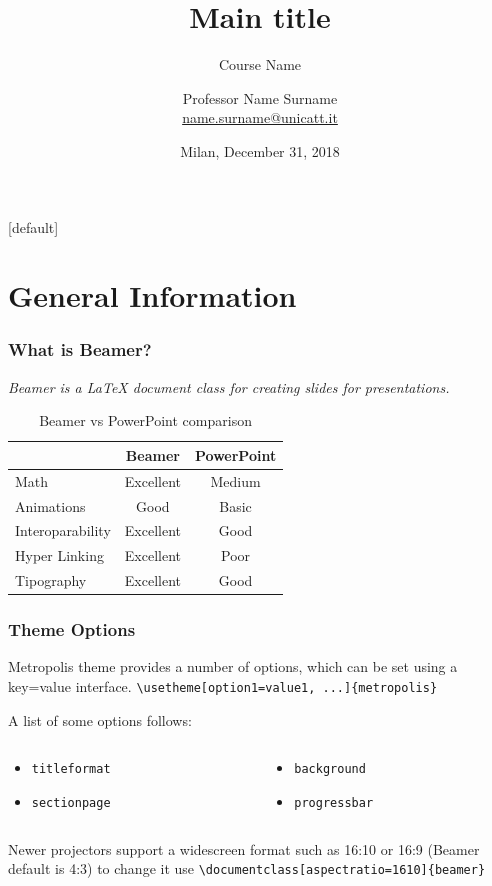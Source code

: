 \documentclass[11pt, xcolor=dvipsnames]{beamer}
\title{Main title} %
\subtitle{Course Name}
\author{Professor Name Surname \\ \small{\href{mailto: name.surname@unicatt.it}{name.surname@unicatt.it}}\bigskip \medskip}
\date{Milan, December 31, 2018 \bigskip \medskip}
\institute{Università Cattolica del Sacro Cuore \\ M.Sc. in \LaTeX \\ Academic Year 2018 $-$ 2019}
\begin{document}
\maketitle

[default]

\section{General Information}

\begin{frame}
\frametitle{What is Beamer?}
\centering
\begin{minipage}{0.75\linewidth}
\textit{Beamer is a LaTeX document class for creating slides for presentations.}
\end{minipage}
\begin{table}[]
\centering
\caption{Beamer vs PowerPoint comparison}
\label{my-label}
\begin{tabular}{@{}lcc@{}}
\toprule
\textbf{} & \textbf{Beamer} & \textbf{PowerPoint} \\ \midrule
Math & Excellent & Medium \\
Animations & Good & Basic \\
Interoparability & Excellent & Good \\
Hyper Linking & \multicolumn{1}{l}{Excellent} & Poor \\
Tipography & \multicolumn{1}{l}{Excellent} & Good \\ \bottomrule
\end{tabular}
\end{table}
\end{frame}


\begin{frame}
\frametitle{Theme Options}
Metropolis theme provides a number of options, which can be set using a key=value interface. \newline
\texttt{\textbackslash \alert{usetheme}[option1=value1, ...]\{metropolis\}} \medskip

A list of some options follows:
 \begin{columns}
	\begin{column}{0.5\textwidth}
   	\begin{itemize}
   		\item \texttt{titleformat}
   		\item \texttt{sectionpage}	
   	\end{itemize}
   	\end{column}
   	\begin{column}{0.5\textwidth}
   	\begin{itemize}
   		\item \texttt{background}
   		\item \texttt{progressbar} \bigskip
   	\end{itemize}
   	\end{column}
\end{columns}
Newer projectors support a widescreen format such as 16:10 or 16:9 (Beamer default is 4:3) to change it use
\texttt{\textbackslash documentclass[aspectratio=1610]\{beamer\}}
\end{frame}
\end{document}
